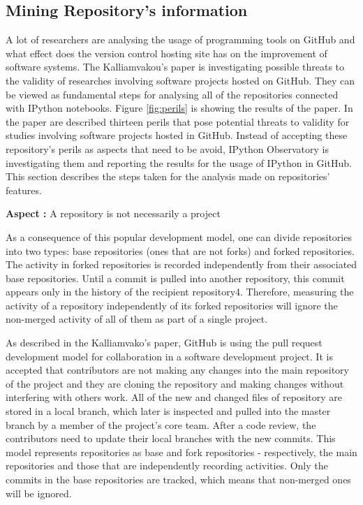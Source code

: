 \subsection{Mining Repository's information}
\label{subsec:mining}

A lot of researchers are analysing the usage of programming tools on GitHub and what effect does the version control hosting site has on the improvement of software systems. The Kalliamvakou's paper \cite{kalliamvakoupromises} is investigating possible threats to the validity of researches involving software projects hosted on GitHub. They can be viewed as fundamental steps for analysing all of the repositories connected with IPython notebooks. Figure \ref{fig:perils} is showing the results of the paper. In the paper are described thirteen perils that pose potential threats to validity for studies involving software projects hosted in GitHub. Instead of accepting these repository's perils as aspects that need to be avoid, IPython Observatory is investigating them and reporting the results for the usage of IPython in GitHub. This section describes the steps taken for the analysis made on repositories' features.

\vspace{5mm}
\begin{mdframed}
\vspace{1px}
\textbf{Aspect :}  A repository is not necessarily a project
\vspace{1px}
\end{mdframed}
\vspace{2mm}

As a consequence of this popular development model, one can divide repositories
into two types: base repositories (ones that are not forks) and forked
repositories. The activity in forked repositories is recorded independently from their associated base repositories. Until a commit is pulled into another repository,
this commit appears only in the history of the recipient repository4.
Therefore, measuring the activity of a repository independently of its forked
repositories will ignore the non-merged activity of all of them as part of a
single project.

As described in the Kalliamvako's paper\cite{kalliamvakoupromises}, GitHub is using the pull request development model for collaboration in a software development project. It is accepted that contributors are not making any changes into the main repository of the project and they are cloning the repository and making changes without interfering with others work. All of the new and changed files of repository are stored in a local branch, which later is inspected and pulled into the master branch by a member of the project's core team. After a code review, the contributors need to update their local branches with the new commits. This model represents repositories as base and fork repositories - respectively, the main repositories and those that are independently recording activities. Only the commits in the base repositories are tracked, which means that non-merged ones will be ignored.


